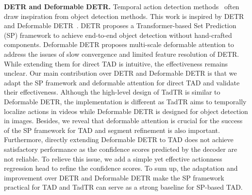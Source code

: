 \documentclass[lettersize,journal]{IEEEtran}
\begin{document}
\vspace{1ex}\noindent \textbf{DETR and Deformable DETR. }
Temporal action detection methods~\cite{xu2017r,lin2017single,yang2020revisiting} often draw inspiration from object detection methods. This work is inspired by DETR~\cite{carion2020end} and Deformable DETR~\cite{zhu2021deformable}.
DETR proposes a Transformer-based Set Prediction (SP) framework to achieve end-to-end object detection without hand-crafted components.
Deformable DETR proposes multi-scale deformable attention to address the issues of slow convergence and limited feature resolution of DETR.
While extending them for direct TAD is intuitive, the effectiveness remains unclear. Our main contribution over DETR and Deformable DETR is that we adapt the SP framework and deformable attention for direct TAD and validate their effectiveness.
Although the high-level design of TadTR is similar to Deformable DETR, the implementation is different as TadTR aims to temporally localize actions in videos while Deformable DETR is designed for object detection in images. Besides, we reveal that deformable attention is crucial for the success of the SP framework for TAD and segment refinement is also important.
Furthermore, directly extending Deformable DETR to TAD does not achieve satisfactory performance as the confidence scores predicted by the decoder are not reliable. 
To relieve this issue, we add a simple yet effective actionness regression head to refine the confidence scores. To sum up, the adaptation and improvement over DETR and Deformable DETR make the SP framework practical for TAD and TadTR can serve as a strong baseline for SP-based TAD.
\end{document}
